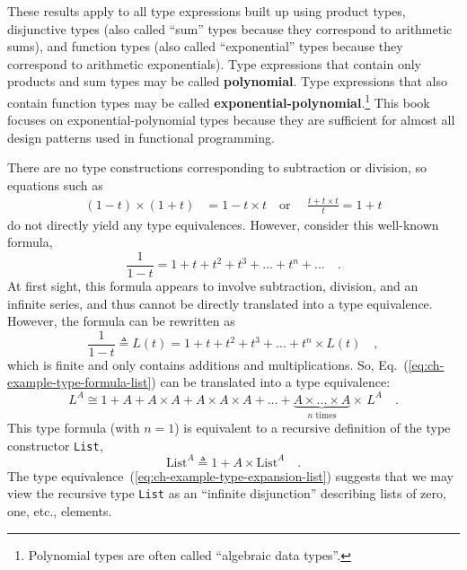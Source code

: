 These results apply to all type expressions built up using product
types, disjunctive types (also called \textsf{``}sum\textsf{''} types because they
correspond to arithmetic sums), and function types (also called \textsf{``}exponential\textsf{''}
types because they correspond to arithmetic exponentials). Type expressions
that contain only products and sum types may be called \textbf{polynomial}.
Type expressions that also contain function types may be called \textbf{exponential-polynomial}.\footnote{Polynomial types are often called \textsf{``}algebraic data types\textsf{''}.}
This book focuses on exponential-polynomial types because they are
sufficient for almost all design patterns used in functional programming.

There are no type constructions corresponding to subtraction or division,
so equations such as 
\begin{align*}
\left(1-t\right)\times\left(1+t\right) & =1-t\times t\quad\text{or }\quad\frac{t+t\times t}{t}=1+t
\end{align*}
do not directly yield any type equivalences. However, consider this
well-known formula,
\[
\frac{1}{1-t}=1+t+t^{2}+t^{3}+...+t^{n}+...\quad.
\]
At first sight, this formula appears to involve subtraction, division,
and an infinite series, and thus cannot be directly translated into
a type equivalence. However, the formula can be rewritten as
\begin{equation}
\frac{1}{1-t}\triangleq L(t)=1+t+t^{2}+t^{3}+...+t^{n}\times L(t)\quad,\label{eq:ch-example-type-formula-list}
\end{equation}
which is finite and only contains additions and multiplications. So,
Eq.~(\ref{eq:ch-example-type-formula-list}) can be translated into
a type equivalence:
\begin{equation}
L^{A}\cong1+A+A\times A+A\times A\times A+...+\underbrace{A\times...\times A}_{n\text{ times}}\times\,L^{A}\quad.\label{eq:ch-example-type-expansion-list}
\end{equation}
This type formula (with $n=1$) is equivalent to a recursive definition
of the type constructor \lstinline!List!,
\[
\text{List}^{A}\triangleq1+A\times\text{List}^{A}\quad.
\]
The type equivalence~(\ref{eq:ch-example-type-expansion-list}) suggests
that we may view the recursive type \lstinline!List! as an \textsf{``}infinite
disjunction\textsf{''} describing lists of zero, one, etc., elements.

